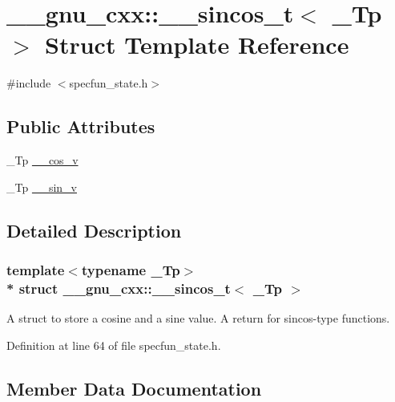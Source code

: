 \hypertarget{struct____gnu__cxx_1_1____sincos__t}{}\section{\+\_\+\+\_\+gnu\+\_\+cxx\+:\+:\+\_\+\+\_\+sincos\+\_\+t$<$ \+\_\+\+Tp $>$ Struct Template Reference}
\label{struct____gnu__cxx_1_1____sincos__t}


{\ttfamily \#include $<$specfun\+\_\+state.\+h$>$}

\subsection*{Public Attributes}
\begin{DoxyCompactItemize}
\item 
\+\_\+\+Tp \hyperlink{struct____gnu__cxx_1_1____sincos__t_ae88c123c9c9b2d138fdaa43b0c1addb6}{\+\_\+\+\_\+cos\+\_\+v}
\item 
\+\_\+\+Tp \hyperlink{struct____gnu__cxx_1_1____sincos__t_a22a21d9a5658097549cbca39b891fd27}{\+\_\+\+\_\+sin\+\_\+v}
\end{DoxyCompactItemize}


\subsection{Detailed Description}
\subsubsection*{template$<$typename \+\_\+\+Tp$>$\\*
struct \+\_\+\+\_\+gnu\+\_\+cxx\+::\+\_\+\+\_\+sincos\+\_\+t$<$ \+\_\+\+Tp $>$}

A struct to store a cosine and a sine value. A return for sincos-\/type functions. 

Definition at line 64 of file specfun\+\_\+state.\+h.



\subsection{Member Data Documentation}
